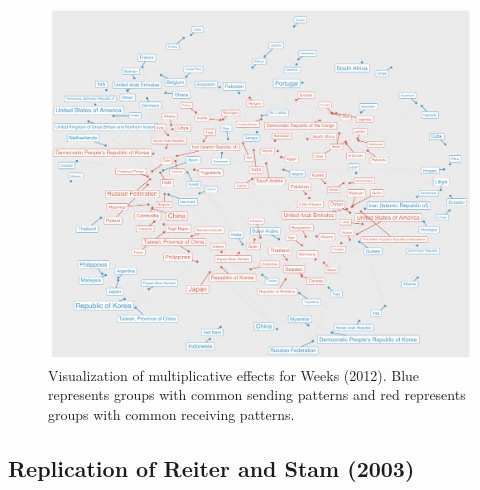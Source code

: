 \documentclass[12pt]{amsart}
\begin{document}
\begin{figure}
\includegraphics[width=\textwidth]{weeks_circPlot.pdf}
\caption{\label{fig:weekscirc} Visualization of multiplicative effects for Weeks (2012). Blue represents groups with common sending patterns and red represents groups with common receiving patterns.}
\end{figure}

\subsection{Replication of Reiter and Stam (2003)}
\end{document}
